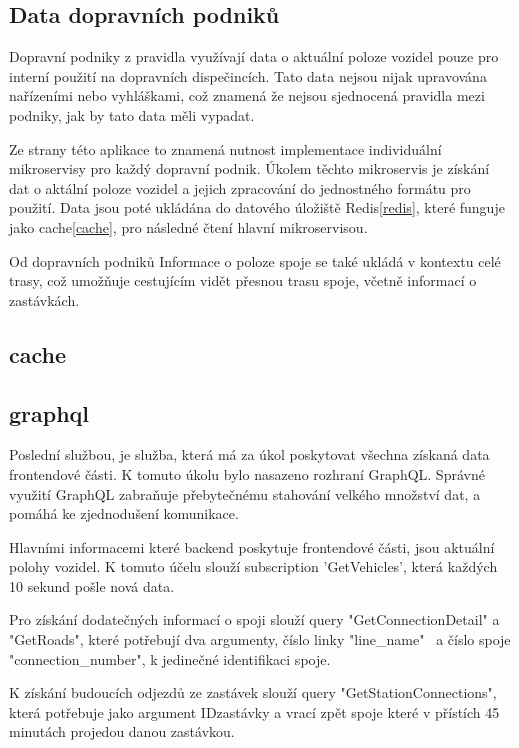 \subsection {Data dopravních podniků}
Dopravní podniky z pravidla využívají data o aktuální poloze vozidel pouze pro interní použití na dopravních dispečincích. Tato data nejsou nijak upravována nařízeními nebo vyhláškami, což znamená že nejsou sjednocená pravidla mezi podniky, jak by tato data měli vypadat.\par
Ze strany této aplikace to znamená nutnost implementace individuální mikroservisy pro každý dopravní podnik. Úkolem těchto mikroservis je získání dat o aktální poloze vozidel a jejich zpracování do jednostného formátu pro použití. Data jsou poté ukládána do datového úložiště Redis\ref{redis}, které funguje jako cache\ref{cache},  pro následné čtení hlavní mikroservisou.\par
Od dopravních podniků
Informace o poloze spoje se také ukládá v kontextu celé trasy, což umožňuje cestujícím vidět přesnou trasu spoje, včetně informací o zastávkách.


\subsection {cache}

\subsection {graphql}\label{mainBackend}
Poslední službou, je služba, která má za úkol poskytovat všechna získaná data frontendové části. K tomuto úkolu bylo nasazeno rozhraní GraphQL. Správné využití GraphQL zabraňuje přebytečnému stahování velkého množství dat, a pomáhá ke zjednodušení komunikace.\par
Hlavními informacemi které backend poskytuje frontendové části, jsou aktuální polohy vozidel. K tomuto účelu slouží subscription 'GetVehicles', která každých 10 sekund pošle nová data.\par
Pro získání dodatečných informací o spoji slouží query "GetConnectionDetail" a "GetRoads", které potřebují dva argumenty, číslo linky "line\_name" \ a číslo spoje "connection\_number", k jedinečné identifikaci spoje.\par
K získání budoucích odjezdů ze zastávek slouží query "GetStationConnections", která potřebuje jako argument IDzastávky a vrací zpět spoje které v přístích 45 minutách projedou danou zastávkou.
